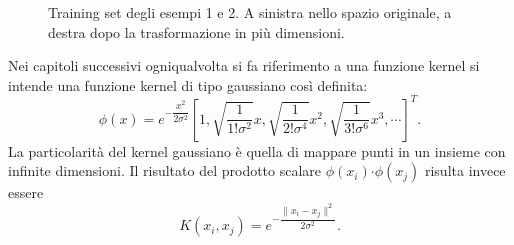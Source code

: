 \documentclass [11pt,a4paper,twoside,openright] {book}
\begin{document}
\begin{figure}[!h]
          \caption{Training set degli esempi 1 e 2. A sinistra nello spazio originale, a destra dopo la trasformazione in più dimensioni.}
\end{figure}\linebreak
Nei capitoli successivi ogniqualvolta si fa riferimento a una funzione kernel si intende una funzione kernel di tipo gaussiano\cite{vert2004primer} così definita:
\begin{equation}
\phi(x) = e^{-\dfrac{x^2}{2\sigma^2}} [1, \sqrt{\dfrac{1}{1! \sigma^2}}x, \sqrt{\dfrac{1}{2! \sigma^4}}x^2, \sqrt{\dfrac{1}{3!\sigma^6}}x^3, \cdots]^T.
\end{equation}
La particolarità del kernel gaussiano è quella di mappare punti in un insieme con infinite dimensioni. Il risultato del prodotto scalare $\phi(x_i) \boldsymbol{\cdot} \phi(x_j)$ risulta invece essere
\begin{equation}
K(x_i,x_j) = e^{-\dfrac{\parallel x_i - x_j \parallel^2}{2\sigma^2}}.
\end{equation}
\end{document}
